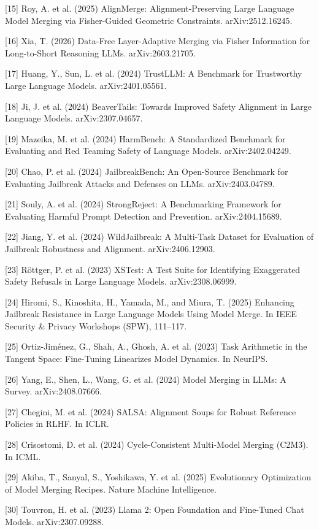 \documentclass{article}
\begin{document}
{[15] Roy, A. et al. (2025) AlignMerge: Alignment-Preserving Large Language Model Merging via Fisher-Guided Geometric Constraints. arXiv:2512.16245.

[16] Xia, T. (2026) Data-Free Layer-Adaptive Merging via Fisher Information for Long-to-Short Reasoning LLMs. arXiv:2603.21705.

[17] Huang, Y., Sun, L. et al. (2024) TrustLLM: A Benchmark for Trustworthy Large Language Models. arXiv:2401.05561.

[18] Ji, J. et al. (2024) BeaverTails: Towards Improved Safety Alignment in Large Language Models. arXiv:2307.04657.

[19] Mazeika, M. et al. (2024) HarmBench: A Standardized Benchmark for Evaluating and Red Teaming Safety of Language Models. arXiv:2402.04249.

[20] Chao, P. et al. (2024) JailbreakBench: An Open-Source Benchmark for Evaluating Jailbreak Attacks and Defenses on LLMs. arXiv:2403.04789.

[21] Souly, A. et al. (2024) StrongReject: A Benchmarking Framework for Evaluating Harmful Prompt Detection and Prevention. arXiv:2404.15689.

[22] Jiang, Y. et al. (2024) WildJailbreak: A Multi-Task Dataset for Evaluation of Jailbreak Robustness and Alignment. arXiv:2406.12903.

[23] Röttger, P. et al. (2023) XSTest: A Test Suite for Identifying Exaggerated Safety Refusals in Large Language Models. arXiv:2308.06999.

[24] Hiromi, S., Kinoshita, H., Yamada, M., and Miura, T. (2025) Enhancing Jailbreak Resistance in Large Language Models Using Model Merge. In IEEE Security \& Privacy Workshops (SPW), 111–117.

[25] Ortiz-Jiménez, G., Shah, A., Ghosh, A. et al. (2023) Task Arithmetic in the Tangent Space: Fine-Tuning Linearizes Model Dynamics. In NeurIPS.

[26] Yang, E., Shen, L., Wang, G. et al. (2024) Model Merging in LLMs: A Survey. arXiv:2408.07666.

[27] Chegini, M. et al. (2024) SALSA: Alignment Soups for Robust Reference Policies in RLHF. In ICLR.

[28] Crisostomi, D. et al. (2024) Cycle-Consistent Multi-Model Merging (C2M3). In ICML.

[29] Akiba, T., Sanyal, S., Yoshikawa, Y. et al. (2025) Evolutionary Optimization of Model Merging Recipes. Nature Machine Intelligence.

[30] Touvron, H. et al. (2023) Llama 2: Open Foundation and Fine-Tuned Chat Models. arXiv:2307.09288.

}
\end{document}
